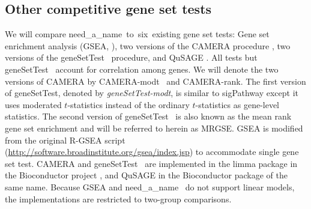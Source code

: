 \documentclass[useAMS,usenatbib, galley]{biom}
\newcommand{\OurMethod}{need\_a\_name}
\newcommand{\HowmanyTest}{six}
\newcommand{\CMR}{CAMERA-rank}
\newcommand{\CMT}{CAMERA-modt}
\newcommand{\gent}{geneSetTest-modt}
\newcommand{\gen}{geneSetTest}
\begin{document}
	\subsection{Other competitive gene set tests}
	We will compare \OurMethod~to~\HowmanyTest~existing gene set tests: Gene set enrichment analysis (GSEA, \cite{subramanian2005gene}), two versions of the CAMERA procedure \citep{wu2012camera}, two versions of the \gen~ procedure, and QuSAGE \citep{yaari2013quantitative}. All tests but \gen~ account for correlation among genes. We will denote the two versions of CAMERA by \CMT~ and \CMR. The first version of \gen, denoted by \textit{\gent}, is similar to sigPathway \citep{tian2005discovering} except it uses moderated $t$-statistics instead of the ordinary $t$-statistics as gene-level statistics. The second version of \gen~ is also known as the mean rank gene set enrichment \citep{michaud2008integrative} and will be referred to herein as MRGSE. GSEA is modified from the original R-GSEA script (\url{http://software.broadinstitute.org/gsea/index.jsp}) to accommodate single gene set test. CAMERA and \gen~ are implemented  in the limma package \citep{smyth2005limma} in the Bioconductor project \citep{gentleman2004bioconductor}, and QuSAGE in the Bioconductor package of the same name. Because GSEA and \OurMethod~ do not support linear models, the implementations are restricted to two-group comparisons.
	
\end{document}
